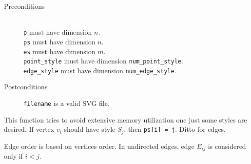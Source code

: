 \begin{description}
 \item[Preconditions]~\\
   \texttt{p} must have dimension $n$.\\
   \texttt{ps} must have dimension $n$.\\
   \texttt{es} must have dimension $m$.\\
   \texttt{point\_style} must have dimension \texttt{num\_point\_style}.\\
   \texttt{edge\_style} must have dimension \texttt{num\_edge\_style}.
 \item[Postconditions]
   \texttt{filename} is a valid SVG file.
\end{description}

This function tries to avoid extensive memory utilization one just some 
styles are desired. If vertex $v_i$ should have style $S_j$, then 
\texttt{ps[i] = j}. Ditto for edges.

Edge order is based on vertices order. In undirected edges, edge $E_{ij}$ 
is considered only if $i < j$.
